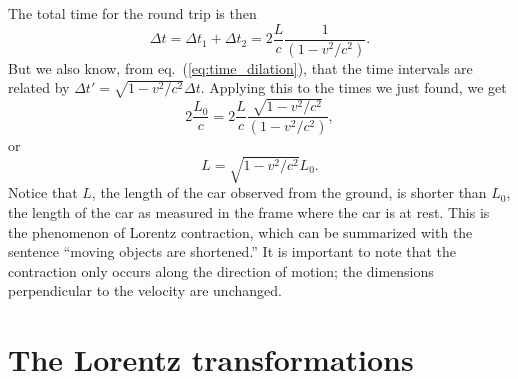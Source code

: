 \documentclass[11pt, a4paper,oneside,openright]{book}
\numberwithin{equation}{section}
\begin{document}
\noindent
The total time for the round trip is then
\begin{equation}
\Delta t=\Delta t_1+\Delta t_2=2\frac{L}{c}\frac{1}{(1-v^2/c^2)}.
\end{equation}
But we also know, from eq.\ (\ref{eq:time_dilation}), that the time intervals are related by $\Delta t'=\sqrt{1-v^2/c^2}\Delta t$. Applying this to the times we just found, we get
\begin{equation}
 2\frac{L_0}{c}=2\frac{L}{c}\frac{\sqrt{1-v^2/c^2}}{(1-v^2/c^2)},
\end{equation}
or
\begin{equation}
L=\sqrt{1-v^2/c^2}L_0.
\end{equation}
Notice that $L$, the length of the car observed from the ground, is shorter than $L_0$, the length of the car as measured in the frame where the car is at rest. This is the phenomenon of Lorentz contraction, which can be summarized with the sentence ``moving objects are shortened.'' It is important to note that the contraction only occurs along the direction of motion; the dimensions perpendicular to the velocity are unchanged.

\section{The Lorentz transformations}
\end{document}

